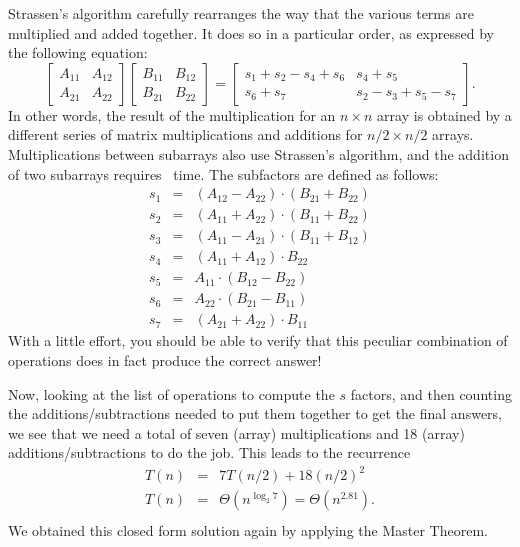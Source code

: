 Strassen's algorithm carefully rearranges the way that the various
terms are multiplied and added together.
It does so in a particular order, as expressed by the following equation:
\[\left [ \begin{array}{cc}
A_{11} & A_{12}\\
A_{21} & A_{22}
\end{array}
\right ]\!\!\left [ \begin{array}{cc}
B_{11} & B_{12}\\
B_{21} & B_{22}
\end{array}
\right ] = \left [ \begin{array}{cc}
s_1 + s_2 - s_4 + s_6\!\! & \!\!s_4 + s_5\\
s_6 + s_7\!\! & \!\!s_2 - s_3 + s_5 - s_7
\end{array}
\right ].\]
In other words, the result of the multiplication for an $n \times n$
array is obtained by a different series of matrix multiplications and
additions for $n/2 \times n/2$ arrays.
Multiplications between subarrays also use Strassen's algorithm,
and the addition of two subarrays requires \Thetantwo\ time.
The subfactors are defined as follows:
\begin{eqnarray*}
s_1 &=& (A_{12} - A_{22}) \cdot (B_{21} + B_{22})\\
s_2 &=& (A_{11} + A_{22}) \cdot (B_{11} + B_{22})\\
s_3 &=& (A_{11} - A_{21}) \cdot (B_{11} + B_{12})\\
s_4 &=& (A_{11} + A_{12}) \cdot B_{22}\\
s_5 &=& A_{11} \cdot (B_{12} - B_{22})\\
s_6 &=& A_{22} \cdot (B_{21} - B_{11})\\
s_7 &=& (A_{21} + A_{22}) \cdot B_{11}
\end{eqnarray*}
With a little effort, you should be able to verify that this peculiar
combination of operations does in fact produce the correct answer!

Now, looking at the list of operations to compute the $s$ factors, and
then counting the additions/subtractions needed to put them together
to get the final answers, we see that we need a total of seven (array)
multiplications and 18 (array) additions/subtractions to do the job.
This leads to the recurrence
\begin{eqnarray*}
T(n) &=& 7T(n/2) + 18(n/2)^2\\
T(n) &=& \Theta(n^{\log_2 7}) = \Theta(n^{2.81}).\\
\end{eqnarray*}
We obtained this closed form solution again by applying the Master
Theorem.

